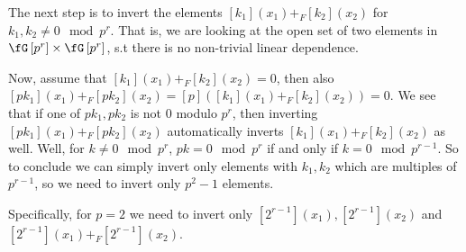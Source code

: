 The next step is to invert the elements $\left[k_1\right]\left(x_1\right) +_F \left[k_2\right]\left(x_2\right)$ for $k_1, k_2 \neq 0 \mod p^r$.
That is, we are looking at the open set of two elements in $\fG\left[p^r\right] \times \fG\left[p^r\right]$, s.t there is no non-trivial linear dependence.

Now, assume that $\left[k_1\right]\left(x_1\right) +_F \left[k_2\right]\left(x_2\right) = 0$, then also $\left[p k_1\right]\left(x_1\right) +_F \left[p k_2\right]\left(x_2\right) = \left[p\right]\left(\left[k_1\right]\left(x_1\right) +_F \left[k_2\right]\left(x_2\right)\right) = 0$.
We see that if one of $p k_1, p k_2$ is not $0$ modulo $p^r$, then inverting $\left[p k_1\right]\left(x_1\right) +_F \left[p k_2\right]\left(x_2\right)$ automatically inverts $\left[k_1\right]\left(x_1\right) +_F \left[k_2\right]\left(x_2\right)$ as well.
Well, for $k \neq 0 \mod p^r$, $pk = 0 \mod p^r$ if and only if $k = 0 \mod p^{r-1}$.
So to conclude we can simply invert only elements with $k_1, k_2$ which are multiples of $p^{r-1}$, so we need to invert only $p^2 - 1$ elements.

Specifically, for $p = 2$ we need to invert only $\left[2^{r-1}\right]\left(x_1\right), \left[2^{r-1}\right]\left(x_2\right)$ and $\left[2^{r-1}\right]\left(x_1\right) +_F \left[2^{r-1}\right]\left(x_2\right)$.
